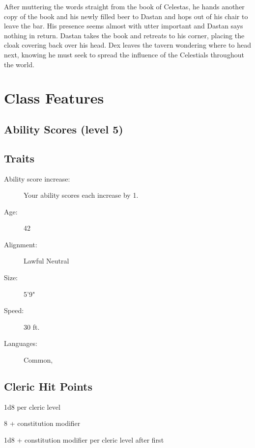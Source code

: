 \documentclass[letterpaper,10pt,twoside,twocolumn,openany]{book}
\begin{document}
After muttering the words straight from the book of Celestas, he hands another copy of the book and his newly filled beer to Dastan and hops out of his chair to leave the bar. His presence seems almost with utter important and Dastan says nothing in return. Dastan takes the book and retreats to his corner, placing the cloak covering back over his head. Dex leaves the tavern wondering where to head next, knowing he must seek to spread the influence of the Celestials throughout the world.

\section{Class Features}

\subsection{Ability Scores (level 5)}
\stats[STR = \stat{16},DEX = \stat{7},CON = \stat{14},INT = \stat{14},WIS = \stat{16},CHA = \stat{12}]

\subsection{Traits}
\begin{description}
	\item[Ability score increase:] Your ability scores each	increase by 1.
	\item[Age:] 42
	\item[Alignment:] Lawful Neutral 
	\item[Size:] 5'9"
	\item[Speed:] 30 ft.
	\item[Languages:] Common, 
\end{description}

\subsection{Cleric Hit Points}

\begin{description}[font=\normalfont\textbf,noitemsep,topsep=1ex,leftmargin=1em]
	\item[Hit Dice:] 1d8 per cleric level
	\item[Hit Points at First Level:] 8 + constitution modifier
	\item[Hit Points at Higher levels:] 1d8 + constitution modifier per cleric level after first
\end{description}
\end{document}
